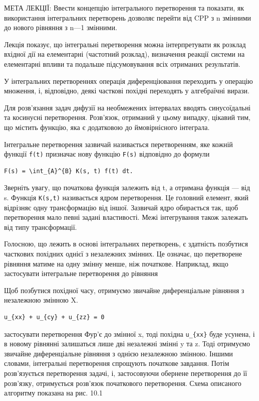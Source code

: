 \documentclass[
  ukrainian,
]{article}
\begin{document}
МЕТА ЛЕКЦІЇ: Ввести концепцію інтегрального перетворення та показати, як
використання інтегральних перетворень дозволяє перейти від CPP з n
змінними до нового рівняння з n---1 змінними.

Лекція показує, що інтегральні перетворення можна інтерпретувати як
розклад вхідної дії на елементарні (частотний розклад), визначення
реакції системи на елементарні впливи та подальше підсумовування всіх
отриманих результатів.

У інтегральних перетвореннях операція диференціювання переходить у
операцію множення, і, відповідно, деякі часткові похідні переходять у
алгебраїчні вирази.

Для розв'язання задач дифузії на необмежених інтервалах вводять
синусоїдальні та косинусні перетворення. Розв'язок, отриманий у цьому
випадку, цікавий тим, що містить функцію, яка є додатковою до
ймовірнісного інтеграла.

Інтегральне перетворення зазвичай називається перетворенням, яке кожній
функції \texttt{f(t)} призначає нову функцію \texttt{F(s)} відповідно до
формули

\begin{verbatim}
F(s) = \int_{A}^{B} K(s, t) f(t) dt.
\end{verbatim}

Зверніть увагу, що початкова функція залежить від t, а отримана функція
--- від s. Функція \texttt{K(s,t)} називається ядром перетворення. Це
головний елемент, який відрізняє одну трансформацію від іншої. Зазвичай
ядро обирається так, щоб перетворення мало певні задані властивості.
Межі інтегрування також залежать від типу трансформації.

Голосною, що лежить в основі інтегральних перетворень, є здатність
позбутися часткових похідних однієї з незалежних змінних. Це означає, що
перетворене рівняння матиме на одну змінну менше, ніж початкове.
Наприклад, якщо застосувати інтегральне перетворення до рівняння

Щоб позбутися похідної часу, отримуємо звичайне диференціальне рівняння
з незалежною змінною X.

\begin{verbatim}
u_{xx} + u_{cy} + u_{zz} = 0
\end{verbatim}

застосувати перетворення Фур'є до змінної x, тоді похідна
\texttt{u\_\{xx\}} буде усунена, і в новому рівнянні залишаться лише дві
незалежні змінні y та z. Тоді отримуємо звичайне диференціальне рівняння
з однією незалежною змінною. Іншими словами, інтегральні перетворення
спрощують початкове завдання. Потім розв'язується перетворення задачі,
і, застосовуючи обернене перетворення до її розв'язку, отримується
розв'язок початкового перетворення. Схема описаного алгоритму показана
на рис. 10.1
\end{document}
